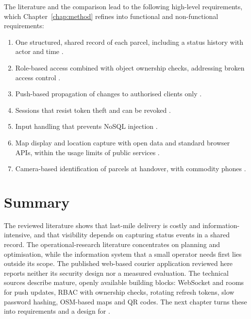 The literature and the comparison lead to the following high-level requirements, which Chapter~\ref{chap:method} refines into functional and non-functional requirements:
\begin{enumerate}[label=R\arabic*.]
  \item One structured, shared record of each parcel, including a status history with actor and time \cite{musa2014visibility}.
  \item Role-based access combined with object ownership checks, addressing broken access control \cite{sandhu1996rbac,owasptop10}.
  \item Push-based propagation of changes to authorised clients only \cite{rfc6455,pimentel2012websocket}.
  \item Sessions that resist token theft and can be revoked \cite{rfc6265,rfc9700}.
  \item Input handling that prevents NoSQL injection \cite{ron2016nosql}.
  \item Map display and location capture with open data and standard browser APIs, within the usage limits of public services \cite{haklay2008osm,w3cgeolocation,nominatimpolicy}.
  \item Camera-based identification of parcels at handover, with commodity phones \cite{iso18004,wibbeling2013epod}.
\end{enumerate}

\section{Summary}

The reviewed literature shows that last-mile delivery is costly and information-intensive, and that visibility depends on capturing status events in a shared record. The operational-research literature concentrates on planning and optimisation, while the information system that a small operator needs first lies outside its scope. The published web-based courier application reviewed here reports neither its security design nor a measured evaluation. The technical sources describe mature, openly available building blocks: WebSocket and rooms for push updates, RBAC with ownership checks, rotating refresh tokens, slow password hashing, OSM-based maps and QR codes. The next chapter turns these into requirements and a design for \scpms.
